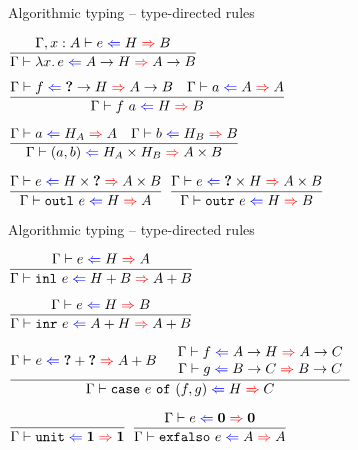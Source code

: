 \documentclass{beamer}
\begin{document}
\begin{frame}{Algorithmic typing -- type-directed rules}

\begin{center}
  $\infrule{\fullhinting{\extend{\Gamma}{x}{A}}{e}{H}{B}}{\hinting{\fun{x}{e}}{\Fun{A}{H}}{\Fun{A}{B}}}$

  \vspace{2em}

  $\infrule{\hinting{f}{\Fun{\Hole}{H}}{\Fun{A}{B}} \quad \hinting{a}{A}{A}}{\hinting{\app{f}{a}}{H}{B}}$

  \vspace{2em}

  $\infrule{\hinting{a}{H_A}{A} \quad \hinting{b}{H_B}{B}}{\hinting{\pair{a}{b}}{\Prod{H_A}{H_B}}{\Prod{A}{B}}}$

  \vspace{2em}

  $\infrule{\hinting{e}{\Prod{H}{\Hole}}{\Prod{A}{B}}}{\hinting{\outl{e}}{H}{A}}$ \quad
  $\infrule{\hinting{e}{\Prod{\Hole}{H}}{\Prod{A}{B}}}{\hinting{\outr{e}}{H}{B}}$
\end{center}

\end{frame}

\begin{frame}{Algorithmic typing -- type-directed rules}

\begin{center}
  $\infrule{\hinting{e}{H}{A}}{\hinting{\inl{e}}{\Sum{H}{B}}{\Sum{A}{B}}}$

  \vspace{2em}

  $\infrule{\hinting{e}{H}{B}}{\hinting{\inr{e}}{\Sum{A}{H}}{\Sum{A}{B}}}$

  \vspace{2em}

  $\infrule{\hinting{e}{\Sum{\Hole}{\Hole}}{\Sum{A}{B}} \quad \begin{array}{c} \hinting{f}{\Fun{A}{H}}{\Fun{A}{C}} \\ \hinting{g}{\Fun{B}{C}}{\Fun{B}{C}} \end{array}}{\hinting{\case{e}{f}{g}}{H}{C}}$

  \vspace{2em}

  $\infrule{}{\hinting{\unit}{\Unit}{\Unit}}$ \quad
  $\infrule{\hinting{e}{\Empty}{\Empty}}{\hinting{\exfalso{e}}{A}{A}}$
\end{center}

\end{frame}
\end{document}
